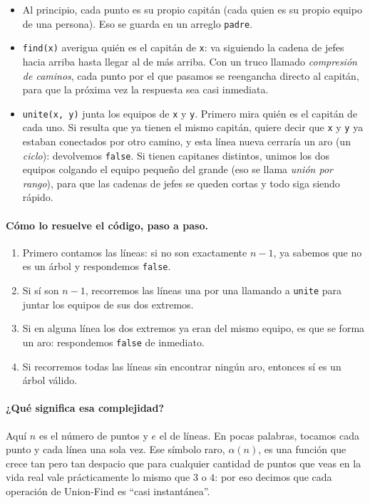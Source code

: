 \begin{itemize}
  \item Al principio, cada punto es su propio capitán (cada quien es su propio
    equipo de una persona). Eso se guarda en un arreglo \texttt{padre}.
  \item \texttt{find(x)} averigua quién es el capitán de \texttt{x}: va
    siguiendo la cadena de jefes hacia arriba hasta llegar al de más arriba.
    Con un truco llamado \emph{compresión de caminos}, cada punto por el que
    pasamos se reengancha directo al capitán, para que la próxima vez la
    respuesta sea casi inmediata.
  \item \texttt{unite(x, y)} junta los equipos de \texttt{x} y \texttt{y}.
    Primero mira quién es el capitán de cada uno. Si resulta que ya tienen el
    mismo capitán, quiere decir que \texttt{x} y \texttt{y} ya estaban
    conectados por otro camino, y esta línea nueva cerraría un aro (un
    \emph{ciclo}): devolvemos \texttt{false}. Si tienen capitanes distintos,
    unimos los dos equipos colgando el equipo pequeño del grande (eso se llama
    \emph{unión por rango}), para que las cadenas de jefes se queden cortas y
    todo siga siendo rápido.
\end{itemize}

\paragraph{Cómo lo resuelve el código, paso a paso.}
\begin{enumerate}
  \item Primero contamos las líneas: si no son exactamente $n-1$, ya sabemos
        que no es un árbol y respondemos \texttt{false}.
  \item Si sí son $n-1$, recorremos las líneas una por una llamando a
        \texttt{unite} para juntar los equipos de sus dos extremos.
  \item Si en alguna línea los dos extremos ya eran del mismo equipo, es que se
        forma un aro: respondemos \texttt{false} de inmediato.
  \item Si recorremos todas las líneas sin encontrar ningún aro, entonces sí es
        un árbol válido.
\end{enumerate}




\paragraph{¿Qué significa esa complejidad?} Aquí $n$ es el número de puntos y
$e$ el de líneas. En pocas palabras, tocamos cada punto y cada línea una sola
vez. Ese símbolo raro, $\alpha(n)$, es una función que crece tan pero tan
despacio que para cualquier cantidad de puntos que veas en la vida real vale
prácticamente lo mismo que $3$ o $4$: por eso decimos que cada operación de
Union-Find es ``casi instantánea''.

